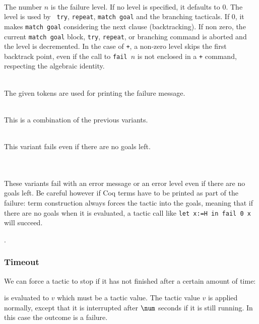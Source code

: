 \begin{Variants}
\item {}\\ The number $n$ is the failure level. If no
  level is specified, it defaults to $0$.  The level is used by {\tt
    try}, {\tt repeat}, {\tt match goal} and the branching tacticals.
  If $0$, it makes {\tt match goal} considering the next clause
  (backtracking). If non zero, the current {\tt match goal} block,
  {\tt try}, {\tt repeat}, or branching command is aborted and the
  level is decremented. In the case of {\tt +}, a non-zero level skips
  the first backtrack point, even if the call to {\tt fail $n$} is not
  enclosed in a {\tt +} command, respecting the algebraic identity.

\item {}\\
The given tokens are used for printing the failure message.

\item {}\\
This is a combination of the previous variants.

\item {}\\
This variant fails even if there are no goals left.

\item {}\\
{}\\
These variants fail with an error message or an error level even if
there are no goals left. Be careful however if Coq terms have to be
printed as part of the failure: term construction always forces the
tactic into the goals, meaning that if there are no goals when it is
evaluated, a tactic call like {\tt let x:=H in fail 0 x} will succeed.

\end{Variants}

\ErrMsg {}.

\subsubsection[Timeout]{Timeout
}

We can force a tactic to stop if it has not finished after a certain
amount of time:
\begin{quote}
{}
\end{quote}
{\tacexpr} is evaluated to $v$ which must be a tactic value.
The tactic value $v$ is
applied normally, except that it is interrupted after ${\num}$ seconds
if it is still running. In this case the outcome is a failure.

